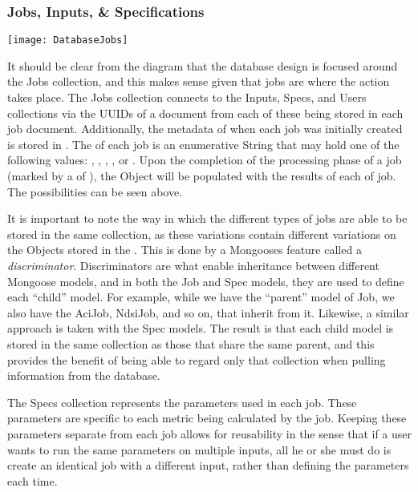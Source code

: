 \subsubsection{Jobs, Inputs, \& Specifications}
\begin{center}
  \texttt{[image: DatabaseJobs]} \\[12pt]
\end{center}
It should be clear from the diagram that the database design is focused around the Jobs collection, and this makes sense given that jobs are where the action takes place. The Jobs collection connects to the Inputs, Specs, and Users collections via the UUID\textquotesingle s of a document from each of these being stored in each job document. Additionally, the metadata of when each job was initially created is stored in . The  of each job is an enumerative String that may hold one of the following values: , , , , or . Upon the completion of the processing phase of a job (marked by a  of ), the  Object will be populated with the results of each  of job. The possibilities can be seen above.\par
It is important to note the way in which the different types of jobs are able to be stored in the same collection, as these variations contain different variations on the Objects stored in the . This is done by a Mongoose\textquotesingle s feature called a \textit{discriminator}. Discriminators are what enable inheritance between different Mongoose models, and in both the Job and Spec models, they are used to define each ``child'' model. For example, while we have the ``parent'' model of Job, we also have the AciJob, NdsiJob, and so on, that inherit from it. Likewise, a similar approach is taken with the Spec models. The result is that each child model is stored in the same collection as those that share the same parent, and this provides the benefit of being able to regard only that collection when pulling information from the database.\par
The Specs collection represents the parameters used in each job. These parameters are specific to each metric being calculated by the job. Keeping these parameters separate from each job allows for reusability in the sense that if a user wants to run the same parameters on multiple inputs, all he or she must do is create an identical job with a different input, rather than defining the parameters each time.

